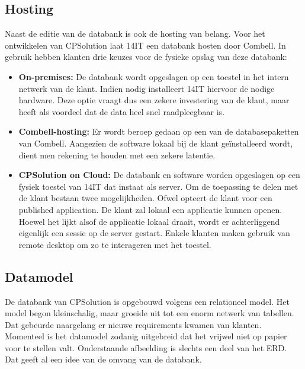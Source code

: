 \subsection{Hosting}
\label{sub:hosting}

Naast de editie van de databank is ook de hosting van belang. Voor het ontwikkelen van CPSolution laat 14IT een databank hosten door Combell. In gebruik hebben klanten drie keuzes voor de fysieke opslag van deze databank:

\begin{itemize}
	\item \textbf{On-premises:} De databank wordt opgeslagen op een toestel in het intern netwerk van de klant. Indien nodig installeert 14IT hiervoor de nodige hardware. Deze optie vraagt dus een zekere investering van de klant, maar heeft als voordeel dat de data heel snel raadpleegbaar is.
	\item \textbf{Combell-hosting:} Er wordt beroep gedaan op een van de databasepaketten van Combell. Aangezien de software lokaal bij de klant geïnstalleerd wordt, dient men rekening te houden met een zekere latentie.
	\item \textbf{CPSolution on Cloud:} De databank en software worden opgeslagen op een fysiek toestel van 14IT dat instaat als server. Om de toepassing te delen met de klant bestaan twee mogelijkheden. Ofwel opteert de klant voor een published application. De klant zal lokaal een applicatie kunnen openen. Hoewel het lijkt alsof de applicatie lokaal draait, wordt er achterliggend eigenlijk een sessie op de server gestart. Enkele klanten maken gebruik van remote desktop om zo te interageren met het toestel.
\end{itemize}

\subsection{Datamodel}
\label{sub:datamodel}

De databank van CPSolution is opgebouwd volgens een relationeel model. Het model begon kleinschalig, maar groeide uit tot een enorm netwerk van tabellen. Dat gebeurde naargelang er nieuwe requirements kwamen van klanten. Momenteel is het datamodel zodanig uitgebreid dat het vrijwel niet op papier voor te stellen valt. Onderstaande afbeelding is slechts een deel van het ERD. Dat geeft al een idee van de omvang van de databank.

